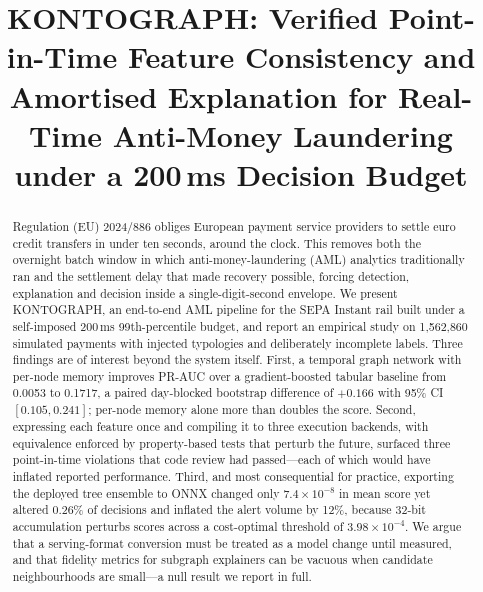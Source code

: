 \documentclass[conference]{IEEEtran}
\begin{document}
\title{KONTOGRAPH: Verified Point-in-Time Feature Consistency and\\
Amortised Explanation for Real-Time Anti-Money Laundering\\
under a 200\,ms Decision Budget}

\author{
}

\maketitle

\begin{abstract}
Regulation (EU) 2024/886 obliges European payment service providers to settle
euro credit transfers in under ten seconds, around the clock. This removes both
the overnight batch window in which anti-money-laundering (AML) analytics
traditionally ran and the settlement delay that made recovery possible, forcing
detection, explanation and decision inside a single-digit-second envelope. We
present KONTOGRAPH, an end-to-end AML pipeline for the SEPA Instant rail built
under a self-imposed 200\,ms 99th-percentile budget, and report an empirical
study on 1{,}562{,}860 simulated payments with injected typologies and
deliberately incomplete labels. Three findings are of interest beyond the
system itself. First, a temporal graph network with per-node memory improves
PR-AUC over a gradient-boosted tabular baseline from 0.0053 to 0.1717, a paired
day-blocked bootstrap difference of $+0.166$ with 95\% CI $[0.105, 0.241]$;
per-node memory alone more than doubles the score. Second, expressing each
feature once and compiling it to three execution backends, with equivalence
enforced by property-based tests that perturb the future, surfaced three
point-in-time violations that code review had passed---each of which would have
inflated reported performance. Third, and most consequential for practice,
exporting the deployed tree ensemble to ONNX changed only $7.4\times10^{-8}$ in
mean score yet altered 0.26\% of decisions and inflated the alert volume by
12\%, because 32-bit accumulation perturbs scores across a cost-optimal
threshold of $3.98\times10^{-4}$. We argue that a serving-format conversion
must be treated as a model change until measured, and that fidelity metrics for
subgraph explainers can be vacuous when candidate neighbourhoods are small---a
null result we report in full.
\end{abstract}
\end{document}
